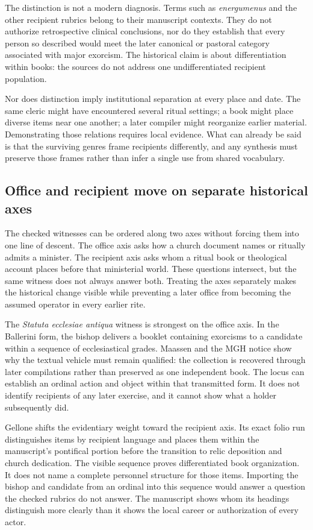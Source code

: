 The distinction is not a modern diagnosis. Terms such as
\emph{energumenus} and the other recipient rubrics belong to their manuscript
contexts. They do not authorize retrospective clinical conclusions, nor do
they establish that every person so described would meet the later canonical
or pastoral category associated with major exorcism. The historical claim is
about differentiation within books: the sources do not address one
undifferentiated recipient population.

Nor does distinction imply institutional separation at every place and date.
The same cleric might have encountered several ritual settings; a book might
place diverse items near one another; a later compiler might reorganize
earlier material. Demonstrating those relations requires local evidence.
What can already be said is that the surviving genres frame recipients
differently, and any synthesis must preserve those frames rather than infer a
single use from shared vocabulary.

\subsection{Office and recipient move on separate historical axes}

The checked witnesses can be ordered along two axes without forcing them into
one line of descent. The office axis asks how a church document names or
ritually admits a minister. The recipient axis asks whom a
ritual book or theological account places before that ministerial world.
These questions intersect, but the same witness does not always answer both.
Treating the axes separately makes the historical change visible while
preventing a later office from becoming the assumed operator in every earlier
rite.

The \emph{Statuta ecclesiae antiqua} witness is strongest on the office axis.
In the Ballerini form, the bishop delivers a booklet containing exorcisms to a
candidate within a sequence of ecclesiastical grades. Maassen and the MGH
notice show why the textual vehicle must remain qualified: the collection is
recovered through later compilations rather than preserved as one independent
book. The locus can establish an ordinal action and object within that
transmitted form. It does not identify recipients of any later exercise, and
it cannot show what a holder subsequently did.

Gellone shifts the evidentiary weight toward the recipient axis. Its exact
folio run distinguishes items by recipient language and places them within
the manuscript's pontifical portion before the transition to relic deposition
and church dedication. The visible sequence proves differentiated book
organization. It does not name a complete personnel structure for those
items. Importing the bishop and candidate from an ordinal into this sequence
would answer a question the checked rubrics do not answer. The manuscript
shows whom its headings distinguish more clearly than it shows the local
career or authorization of every actor.

